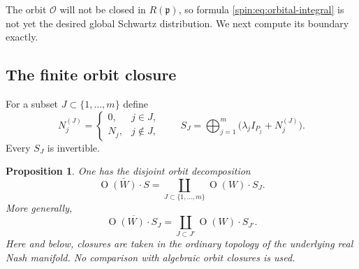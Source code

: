 \documentclass[10pt,a4paper]{amsart}
\numberwithin{equation}{section}
\newtheorem{proposition}[theorem]{Proposition}
\newcommand{\Or}{\operatorname{O}}
\newcommand{\fp}{\mathfrak p}
\newcommand{\cO}{\mathcal O}
\begin{document}
The orbit $\cO$ will not be closed in $R(\fp)$, so formula
\eqref{spin:eq:orbital-integral} is not yet the desired global Schwartz
distribution.  We next compute its boundary exactly.

\subsection{The finite orbit closure}\label{spin:sec:closure}

For a subset $J\subset\{1,\ldots,m\}$ define
\begin{equation}\label{spin:eq:SJ}
  N_j^{(J)}=
  \begin{cases}
    0,&j\in J,\\
    N_j,&j\notin J,
  \end{cases}
  \qquad
  S_J=\bigoplus_{j=1}^m
  \bigl(\lambda_jI_{P_j}+N_j^{(J)}\bigr).
\end{equation}
Every $S_J$ is invertible.

\begin{proposition}\label{spin:prop:base-closure}
One has the disjoint orbit decomposition
\begin{equation}\label{spin:eq:base-closure}
  \overline{\Or(W)\cdot S}
  =
  \coprod_{J\subset\{1,\ldots,m\}}
  \Or(W)\cdot S_J.
\end{equation}
More generally,
\[
  \overline{\Or(W)\cdot S_J}
  =
  \coprod_{J\subset J'}\Or(W)\cdot S_{J'}.
\]
Here and below, closures are taken in the ordinary topology of the
underlying real Nash manifold.  No comparison with algebraic orbit closures
is used.
\end{proposition}
\end{document}
